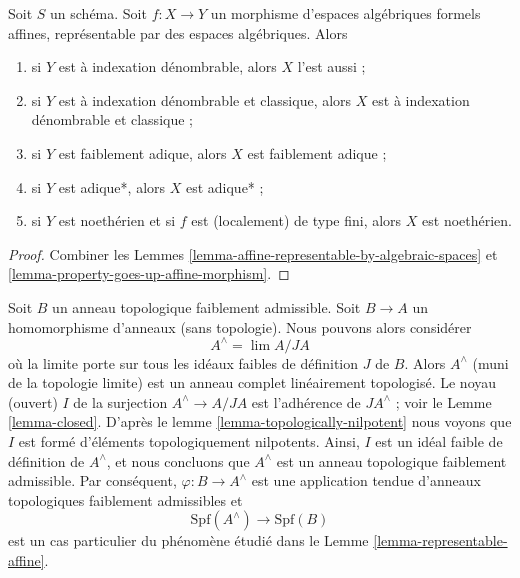 \begin{lemma}
\label{lemma-property-goes-up-affine}
Soit $S$ un schéma. Soit $f : X \to Y$ un morphisme d'espaces algébriques
formels affines, représentable par des espaces algébriques. Alors
\begin{enumerate}
\item si $Y$ est à indexation dénombrable, alors $X$ l'est aussi ;
\item si $Y$ est à indexation dénombrable et classique, alors $X$ est à indexation
dénombrable et classique ;
\item si $Y$ est faiblement adique, alors $X$ est faiblement adique ;
\item si $Y$ est adique*, alors $X$ est adique* ;
\item si $Y$ est noethérien et si $f$ est (localement) de type fini, alors
$X$ est noethérien.
\end{enumerate}
\end{lemma}

\begin{proof}
Combiner les Lemmes \ref{lemma-affine-representable-by-algebraic-spaces} et
\ref{lemma-property-goes-up-affine-morphism}.
\end{proof}

\begin{example}
\label{example-representable-morphism-from-completion}
Soit $B$ un anneau topologique faiblement admissible. Soit $B \to A$
un homomorphisme d'anneaux (sans topologie). Nous pouvons alors considérer
$$
A^\wedge = \lim A/JA
$$
où la limite porte sur tous les idéaux faibles de définition $J$ de $B$.
Alors $A^\wedge$ (muni de la topologie limite) est un anneau
complet linéairement topologisé. Le noyau (ouvert) $I$
de la surjection $A^\wedge \to A/JA$ est l'adhérence de $JA^\wedge$ ; voir le
Lemme \ref{lemma-closed}. D'après le
lemme \ref{lemma-topologically-nilpotent}
nous voyons que $I$ est formé d'éléments topologiquement nilpotents.
Ainsi, $I$ est un idéal faible de définition de $A^\wedge$, et nous concluons que
$A^\wedge$ est un anneau topologique faiblement admissible. Par conséquent,
$\varphi : B \to A^\wedge$ est une application tendue d'anneaux topologiques
faiblement admissibles et
$$
\text{Spf}(A^\wedge) \longrightarrow \text{Spf}(B)
$$
est un cas particulier du phénomène étudié dans le
Lemme \ref{lemma-representable-affine}.
\end{example}

